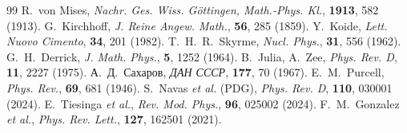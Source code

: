 \documentclass[12pt,a4paper]{article}
\begin{document}
	\begin{thebibliography}{99}
		 R.~von Mises, \textit{Nachr. Ges. Wiss. G{\"o}ttingen, Math.-Phys. Kl.}, \textbf{1913}, 582 (1913).
		 G.~Kirchhoff, \textit{J. Reine Angew. Math.}, \textbf{56}, 285 (1859).
		 Y.~Koide, \textit{Lett. Nuovo Cimento}, \textbf{34}, 201 (1982).
		 T.~H.~R.~Skyrme, \textit{Nucl. Phys.}, \textbf{31}, 556 (1962).
		 G.~H.~Derrick, \textit{J. Math. Phys.}, \textbf{5}, 1252 (1964).
		 B.~Julia, A.~Zee, \textit{Phys. Rev. D}, \textbf{11}, 2227 (1975).
		 А.~Д.~Сахаров, \textit{ДАН СССР}, \textbf{177}, 70 (1967).
		 E.~M.~Purcell, \textit{Phys. Rev.}, \textbf{69}, 681 (1946).
		 S.~Navas \textit{et al.} (PDG), \textit{Phys. Rev. D}, \textbf{110}, 030001 (2024).
		 E.~Tiesinga \textit{et al.}, \textit{Rev. Mod. Phys.}, \textbf{96}, 025002 (2024).
		 F.~M.~Gonzalez \textit{et al.}, \textit{Phys. Rev. Lett.}, \textbf{127}, 162501 (2021).
	\end{thebibliography}
	
\end{document}
